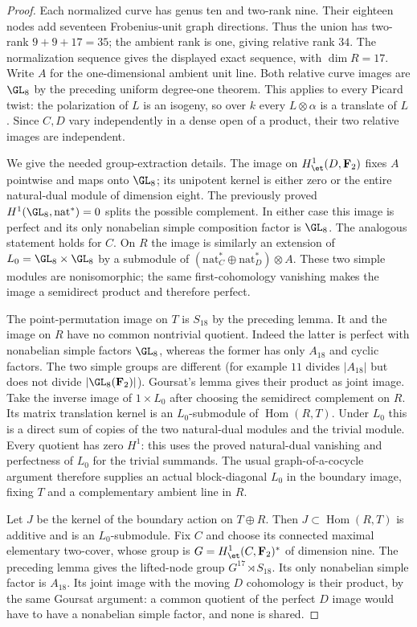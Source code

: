 \begin{proof}
Each normalized curve has genus ten and two-rank nine.
Their eighteen nodes add seventeen Frobenius-unit graph
directions. Thus the union has two-rank $9+9+17=35$;
the ambient rank is one, giving relative rank $34$.
The normalization sequence gives the displayed exact sequence,
with $\dim R=17$.
Write $A$ for the one-dimensional ambient unit line.
Both relative curve images are $\GL_8$ by the preceding
uniform degree-one theorem. This applies to every Picard
twist: the polarization of $L$ is an isogeny, so over $k$
every $L\otimes\alpha$ is a translate of $L$.
Since $C,D$ vary independently in a dense open of a product,
their two relative images are independent.

We give the needed group-extraction details. The image on
$H^1_{\et}(D,\mathbf F_2)$ fixes $A$ pointwise and maps
onto $\GL_8$; its unipotent kernel is either zero or the
entire natural-dual module of dimension eight. The previously
proved $H^1(\GL_8,\mathrm{nat}^*)=0$ splits the possible
complement. In either case this image is perfect and its
only nonabelian simple composition factor is $\GL_8$.
The analogous statement holds for $C$.
On $R$ the image is similarly an extension of
$L_0=\GL_8\times\GL_8$ by a submodule of
$(\mathrm{nat}_C^*\oplus\mathrm{nat}_D^*)\otimes A$.
These two simple modules are nonisomorphic; the same
first-cohomology vanishing makes the image a semidirect
product and therefore perfect.

The point-permutation image on $T$ is $S_{18}$ by the
preceding lemma. It and the image on $R$ have no common
nontrivial quotient. Indeed the latter is perfect with
nonabelian simple factors $\GL_8$, whereas the former has
only $A_{18}$ and cyclic factors. The two simple groups
are different (for example $11$ divides $|A_{18}|$ but
does not divide $|\GL_8(\mathbf F_2)|$).
Goursat's lemma gives their product as joint image.
Take the inverse image of $1\times L_0$ after choosing
the semidirect complement on $R$. Its matrix translation
kernel is an $L_0$-submodule of $\operatorname{Hom}(R,T)$.
Under $L_0$ this is a direct sum of copies of the two
natural-dual modules and the trivial module. Every quotient
has zero $H^1$: this uses the proved natural-dual vanishing
and perfectness of $L_0$ for the trivial summands.
The usual graph-of-a-cocycle argument therefore supplies
an actual block-diagonal $L_0$ in the boundary image,
fixing $T$ and a complementary ambient line in $R$.

Let $J$ be the kernel of the boundary action on $T\oplus R$.
Then $J\subset\operatorname{Hom}(R,T)$ is additive and is
an $L_0$-submodule. Fix $C$ and choose its connected maximal
elementary two-cover, whose group is
$G=H^1_{\et}(C,\mathbf F_2)^*$ of dimension nine.
The preceding lemma gives the lifted-node group
$G^{17}\rtimes S_{18}$. Its only nonabelian simple factor
is $A_{18}$. Its joint image with the moving $D$ cohomology
is their product, by the same Goursat argument: a common
quotient of the perfect $D$ image would have to have a
nonabelian simple factor, and none is shared.


\end{proof}
